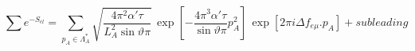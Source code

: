 \begin{equation}
\sum e^{-S_{cl}}=\sum _{p_{A}\in \Lambda _{A}^{*}}\sqrt{\frac{4\pi ^{2}\alpha
    '\tau }{L^{2}_{A}\sin \vartheta \pi }}\, \exp \left[ -\frac{4\pi
    ^{3}\alpha '\tau }{\sin \vartheta \pi }p_{A}^{2}\right] \, \exp \left[
  2\pi i\Delta f_{e\mu }.p_{A}\right] +subleading
\end{equation}


